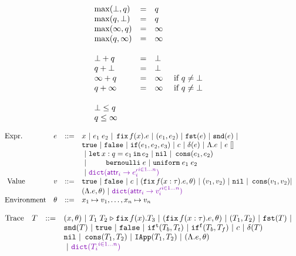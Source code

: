 \[\begin{array}{lcl}
\max(\bot, \nnatbiA) & = & \nnatbiA \\
\max(\nnatbiA, \bot) & = & \nnatbiA \\
\max(\infty, \nnatbiA) & = & \infty \\
\max(\nnatbiA, \infty) & = & \infty \\
\\
%
\bot + \nnatbiA & = & \bot \\
\nnatbiA + \bot & = & \bot \\
\infty + \nnatbiA & = & \infty ~~~~ \mbox{if } \nnatbiA \neq \bot \\
\nnatbiA + \infty & = & \infty ~~~~ \mbox{if } \nnatbiA \neq \bot \\
\\
%
\bot \leq \nnatbiA \\
\nnatbiA \leq \infty
\end{array}
\]

\[\begin{array}{llll}
\mbox{Expr.} & \expr & ::= & x ~|~ \expr_1 \eapp \expr_2 ~|~ \efix f(x).\expr
 ~|~ (\expr_1, \expr_2) ~|~ \eprojl(\expr) ~|~ \eprojr(\expr) ~| \\
%
& & & \etrue ~|~ \efalse ~|~ \eif(\expr_1, \expr_2, \expr_3) ~|~
\econst ~|~ \eop(\expr)  ~|~  {\eilam \expr ~|~ \expr \eapp [] } \\
& & & ~|~  {\elet  x:q = \expr_1 \ein \expr_2 } ~|~ \enil ~|~  \econs (
      \expr_1, \expr_2) \\
& & & ~|~ { ~~~~~~~
 \bernoulli \eapp \expr ~|~ \uniform \eapp \expr_1 \eapp
      \expr_2 } \\
& & & ~|~  \wq{ \evec({\attr_i \to \expr_i'}^{ i \in 1\dots n})    } \\\
%
\mbox{Value} & \valr & ::= & \etrue ~|~ \efalse ~|~ \econst ~|~
(\efix f(x:\type).\expr, \env) ~|~ (\valr_1, \valr_2) 
    ~|~ \enil ~|~ \econs (\valr_1, \valr_2) | \\
& & & {(\eilam \expr , \env) } ~|~ \wq{ \evec 
({\attr_i \to \valr_i'}^{ i \in 1\dots n} )  } \\
%
\mbox{Environment} & \env & ::= & x_1 \mapsto \valr_1, \ldots, x_n \mapsto \valr_n
\end{array}\]


\[\begin{array}{llll}
\mbox{Trace} & \tr & ::= &  {(x, \env)} ~|~ \trapp{\tr_1}{\tr_2}{f}{x}{\tr_3} ~|~
{ (\trfix f(x:\type).e, \env) } ~|~ (\tr_1, \tr_2) ~|~ \trprojl(\tr) ~|\\ 
%
& & & \trprojr(\tr) ~|~ \trtrue ~|~ \trfalse ~|~ \trift(\tr_b, \tr_t)
~|~ \triff(\tr_b, \tr_f) ~|~ \trconst ~|~ \trop(\tr) \\
%
& & & \trnil ~|~ \trcons (\tr_1, \tr_2) ~|~ \triapp{\tr_1}{\tr_2} ~|~
       {(\eilam \expr, \env)} \\
& & & ~|~  \wq { \evec({\tr_i} ^{i \in 1\dots n}) } \\
\end{array}\]



